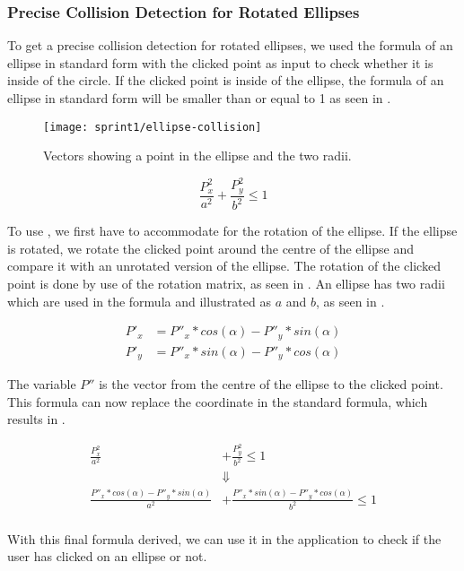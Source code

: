 \subsubsection{Precise Collision Detection for Rotated Ellipses}
To get a precise collision detection for rotated ellipses, we used the formula of an ellipse in standard form with the clicked point as input to check whether it is inside of the circle.
If the clicked point is inside of the ellipse, the formula of an ellipse in standard form will be smaller than or equal to 1 as seen in .

\begin{figure}[h]
	\centering
	\texttt{[image: sprint1/ellipse-collision]}
	\caption{Vectors showing a point in the ellipse and the two radii.}
	\label{figure:ellipse-collision}
\end{figure}

\begin{equation}\label{eq:standard-equation}
	\frac{P_x^2}{a^2} + \frac{P_y^2}{b^2} \leq 1
\end{equation}

To use , we first have to accommodate for the rotation of the ellipse.
If the ellipse is rotated, we rotate the clicked point around the centre of the ellipse and compare it with an unrotated version of the ellipse.
The rotation of the clicked point is done by use of the rotation matrix, as seen in .
An ellipse has two radii which are used in the formula and illustrated as $a$ and $b$, as seen in .

\begin{equation}\label{eq:ellipses-rotation-matrix}
\begin{aligned}
	P'_x &= P''_x * cos(\alpha) - P''_y * sin(\alpha)\\
	P'_y &= P''_x * sin(\alpha) - P''_y * cos(\alpha)
\end{aligned}
\end{equation}

The variable $P''$ is the vector from the centre of the ellipse to the clicked point.
This formula can now replace the coordinate in the standard formula, which results in .

\begin{equation}\label{eq:final-ellipses-equation}
\begin{aligned}
	\frac{P_x^2}{a^2} &+ \frac{P_y^2}{b^2} \leq 1	\\
	&\Downarrow\\
	\frac{ P''_x * cos(\alpha) - P''_y * sin(\alpha)}{a^2} &+ \frac{P''_x * sin(\alpha) - P''_y * cos(\alpha)}{b^2} \leq 1\\
\end{aligned}
\end{equation}

With this final formula derived, we can use it in the application to check if the user has clicked on an ellipse or not.